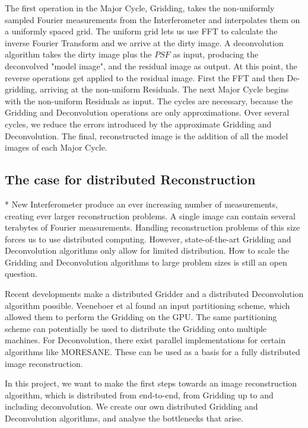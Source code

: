 \documentclass[11pt]{article}
\numberwithin{equation}{section}
\begin{document}
The first operation in the Major Cycle, Gridding, takes the non-uniformly sampled Fourier measurements from the Interferometer and interpolates them on a uniformly spaced grid. The uniform grid lets us use FFT to calculate the inverse Fourier Transform and we arrive at the dirty image. A deconvolution algorithm takes the dirty image plus the $PSF$ as input, producing the deconvolved "model image", and the residual image as output. At this point, the reverse operations get applied to the residual image. First the FFT and then De-gridding, arriving at the non-uniform Residuals. The next Major Cycle begins with the non-uniform Residuals as input. The cycles are necessary, because the Gridding and Deconvolution operations are only approximations. Over several cycles, we reduce the errors introduced by the approximate Gridding and Deconvolution. The final, reconstructed image is the addition of all the model images of each Major Cycle. 

\subsection*{The case for distributed Reconstruction}*
New Interferometer produce an ever increasing number of measurements, creating ever larger reconstruction problems. A single image can contain several terabytes of Fourier measurements. Handling reconstruction problems of this size forces us to use distributed computing. However, state-of-the-art Gridding and Deconvolution algorithms only allow for limited distribution. How to scale the Gridding and Deconvolution algorithms to large problem sizes is still an open question.

Recent developments make a distributed Gridder and a distributed Deconvolution algorithm possible. Veeneboer et al\cite{veenboer2017image} found an input partitioning scheme, which allowed them to perform the Gridding on the GPU. The same partitioning scheme can potentially be used to distribute the Gridding onto multiple machines. For Deconvolution, there exist parallel implementations for certain algorithms like MORESANE\cite{dabbech2015moresane}. These can be used as a basis for a fully distributed image reconstruction.

In this project, we want to make the first steps towards an image reconstruction algorithm, which is distributed from end-to-end, from Gridding up to and including deconvolution. We create our own distributed Gridding and Deconvolution algorithms, and analyse the bottlenecks that arise.
\end{document}

